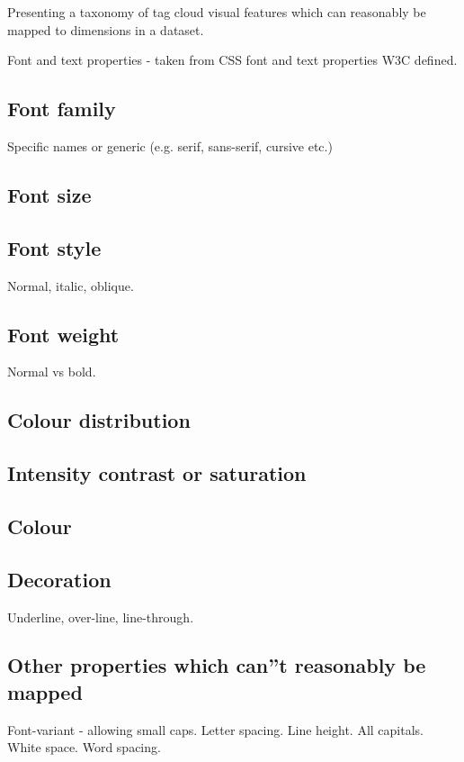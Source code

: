 
Presenting a taxonomy of tag cloud visual features which can reasonably be mapped to dimensions in a dataset.

Font and text properties - taken from CSS font and text properties W3C defined.

\subsection{Font family}
Specific names or generic (e.g. serif, sans-serif, cursive etc.)

\subsection{Font size}

\subsection{Font style}
Normal, italic, oblique.

\subsection{Font weight}
Normal vs bold.

\subsection{Colour distribution}

\subsection{Intensity contrast or saturation}

\subsection{Colour}

\subsection{Decoration}
Underline, over-line, line-through.

\subsection{Other properties which can''t reasonably be mapped}
Font-variant - allowing small caps. Letter spacing. Line height. All capitals. White space. Word spacing.



